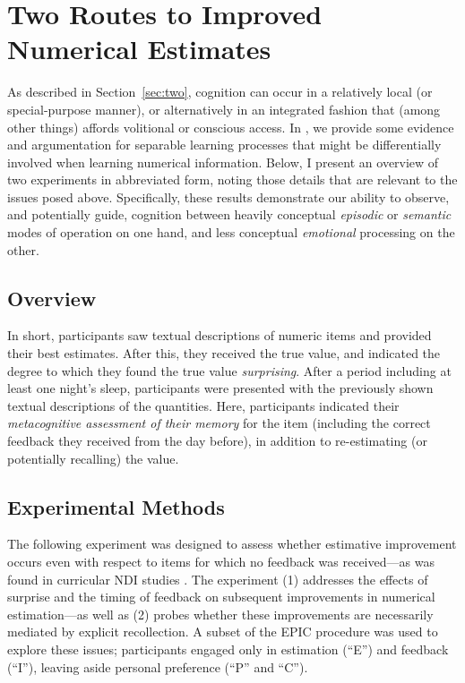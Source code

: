 \graphicspath{{two-routes-estimation/}}

\chapter{Two Routes to Improved Numerical Estimates}
\label{chap:two}

As described in Section~\ref{sec:two}, cognition can occur in a relatively local
(or special-purpose manner), or alternatively in an integrated fashion that (among
other things) affords volitional or conscious access. In
\textcite{clark_known_2010}, we provide some evidence and argumentation
for separable learning processes that might be differentially involved when
learning numerical information. Below, I present an overview of two experiments
in abbreviated form, noting those details that are relevant to the issues
posed above. Specifically, these results demonstrate our ability to observe, and
potentially guide, cognition between heavily conceptual \emph{episodic} or
\emph{semantic} modes of operation on one hand, and less conceptual
\emph{emotional} processing on the other.

\section{Overview}

In short, participants saw textual descriptions of numeric items and provided
their best estimates. After this, they received the true value, and indicated
the degree to which they found the true value \emph{surprising}. After a period
including at least one night's sleep, participants were presented with the
previously shown textual descriptions of the quantities.  Here, participants
indicated their \emph{metacognitive assessment of their memory} for the item
(including the correct feedback they received from the day before), in addition to
re-estimating (or potentially recalling) the value.

\section{Experimental Methods}

The following experiment was designed to assess whether estimative improvement
occurs even with respect to items for which no feedback was received---as was
found in curricular NDI studies
\parencite[e.g.,][]{munnich_numerically-driven_2004,ranney_designing_2008}. The
experiment (1) addresses the effects of surprise and the timing of feedback on
subsequent improvements in numerical estimation---as well as (2) probes whether
these improvements are necessarily mediated by explicit recollection. A subset
of the EPIC procedure was used to explore these issues; participants engaged
only in estimation (``E'') and feedback (``I''), leaving aside personal
preference (``P'' and ``C''). 

